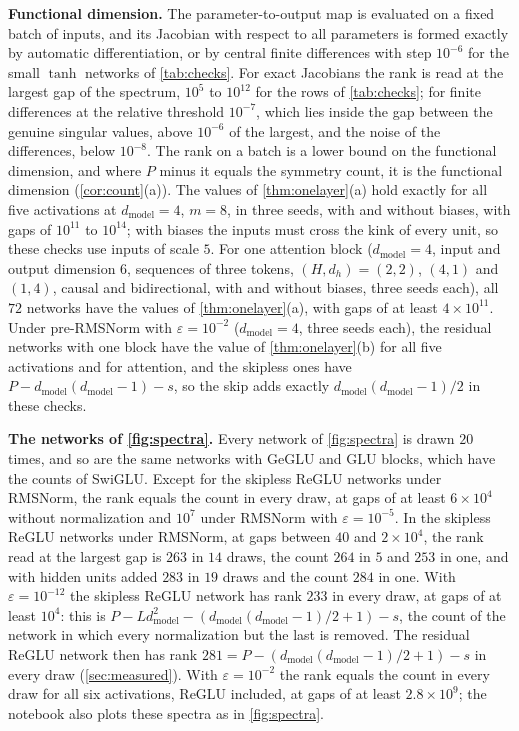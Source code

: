 \documentclass[10pt]{article}
\theoremstyle{definition}
\theoremstyle{remark}
\newcommand{\dm}{d_{\mathrm{model}}}
\newcommand{\para}[1]{\smallskip\noindent\textbf{#1}\hspace{0.5em}}
\begin{document}
\para{Functional dimension.} The parameter-to-output map is evaluated on a fixed batch of inputs, and its Jacobian with respect to all parameters is formed exactly by automatic differentiation, or by central finite differences with step $10^{-6}$ for the small $\tanh$ networks of \cref{tab:checks}. For exact Jacobians the rank is read at the largest gap of the spectrum, $10^5$ to $10^{12}$ for the rows of \cref{tab:checks}; for finite differences at the relative threshold $10^{-7}$, which lies inside the gap between the genuine singular values, above $10^{-6}$ of the largest, and the noise of the differences, below $10^{-8}$. The rank on a batch is a lower bound on the functional dimension, and where $P$ minus it equals the symmetry count, it is the functional dimension (\cref{cor:count}(a)). The values of \cref{thm:onelayer}(a) hold exactly for all five activations at $\dm = 4$, $m = 8$, in three seeds, with and without biases, with gaps of $10^{11}$ to $10^{14}$; with biases the inputs must cross the kink of every unit, so these checks use inputs of scale $5$. For one attention block ($\dm = 4$, input and output dimension $6$, sequences of three tokens, $(H, d_h) = (2, 2)$, $(4, 1)$ and $(1, 4)$, causal and bidirectional, with and without biases, three seeds each), all $72$ networks have the values of \cref{thm:onelayer}(a), with gaps of at least $4\times10^{11}$. Under pre-RMSNorm with $\varepsilon = 10^{-2}$ ($\dm = 4$, three seeds each), the residual networks with one block have the value of \cref{thm:onelayer}(b) for all five activations and for attention, and the skipless ones have $P - \dm(\dm-1) - s$, so the skip adds exactly $\dm(\dm-1)/2$ in these checks.

\para{The networks of \cref{fig:spectra}.} Every network of \cref{fig:spectra} is drawn $20$ times, and so are the same networks with GeGLU and GLU blocks, which have the counts of SwiGLU. Except for the skipless ReGLU networks under RMSNorm, the rank equals the count in every draw, at gaps of at least $6\times10^{4}$ without normalization and $10^{7}$ under RMSNorm with $\varepsilon = 10^{-5}$. In the skipless ReGLU networks under RMSNorm, at gaps between $40$ and $2\times10^{4}$, the rank read at the largest gap is $263$ in $14$ draws, the count $264$ in $5$ and $253$ in one, and with hidden units added $283$ in $19$ draws and the count $284$ in one. With $\varepsilon = 10^{-12}$ the skipless ReGLU network has rank $233$ in every draw, at gaps of at least $10^4$: this is $P - L\dm^2 - (\dm(\dm-1)/2 + 1) - s$, the count of the network in which every normalization but the last is removed. The residual ReGLU network then has rank $281 = P - (\dm(\dm-1)/2 + 1) - s$ in every draw (\cref{sec:measured}). With $\varepsilon = 10^{-2}$ the rank equals the count in every draw for all six activations, ReGLU included, at gaps of at least $2.8\times10^{9}$; the notebook also plots these spectra as in \cref{fig:spectra}.
\end{document}
